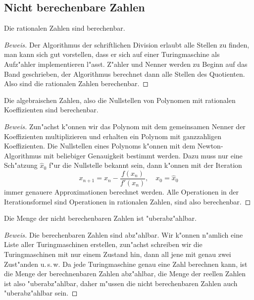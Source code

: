 \subsection{Nicht berechenbare Zahlen}

\begin{satz}
Die rationalen Zahlen sind berechenbar.
\end{satz}

\begin{proof}[Beweis]
Der Algorithmus der schriftlichen Division erlaubt alle Stellen
zu finden, man kann sich gut vorstellen, dass er sich auf einer
Turingmaschine als Aufz"ahler implementieren l"asst. Z"ahler und
Nenner werden zu Beginn auf das Band geschrieben, der Algorithmus
berechnet dann alle Stellen des Quotienten. Also sind die rationalen
Zahlen berechenbar.
\end{proof}

\begin{satz}Die algebraischen Zahlen, also die Nullstellen von
Polynomen mit rationalen Koeffizienten sind berechenbar.
\end{satz}

\begin{proof}[Beweis]
Zun"achst k"onnen wir das Polynom mit dem gemeinsamen Nenner der
Koeffizienten multiplizieren und erhalten ein Polynom mit ganzzahligen
Koeffizienten.
Die Nullstellen eines Polynoms k"onnen mit dem Newton-Algorithmus
mit beliebiger Genauigkeit bestimmt werden. Dazu muss nur eine
Sch"atzung $\hat x_0$ f"ur die Nullstelle bekannt sein, dann k"onnen
mit der Iteration
\[
x_{n+1}=x_n-\frac{f(x_n)}{f'(x_n)},\quad x_0 = \hat x_0
\]
immer genauere Approximationen berechnet werden. Alle Operationen
in der Iterationsformel sind Operationen in rationalen Zahlen, sind
also berechenbar.
\end{proof}

\begin{satz}
Die Menge der nicht berechenbaren Zahlen ist "uberabz"ahlbar.
\end{satz}

\begin{proof}[Beweis]
Die berechenbaren Zahlen sind abz"ahlbar. Wir k"onnen n"amlich
eine Liste aller Turingmaschinen erstellen, zun"achst schreiben
wir die Turingmaschinen mit nur einem Zustand hin, dann all jene
mit genau zwei Zust"anden u.\,s.\,w. Da jede Turingmaschine genau eine
Zahl berechnen kann, ist die Menge der berechnenbaren Zahlen abz"ahlbar,
die Menge der reellen Zahlen ist also "uberabz"ahlbar, daher m"ussen die
nicht berechenbaren Zahlen auch "uberabz"ahlbar sein.
\end{proof}

